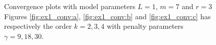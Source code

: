 \begin{figure}
    \caption{ Convergence plots with model parameters $L=1$, $m=7$ and $r=3$ Figures \ref{fig:ex1_conv:a}, \ref{fig:ex1_conv:b} and \ref{fig:ex1_conv:c} has respectively the order $k=2,3, 4$ with penalty parameters $\gamma = 9,18,30 $.  }
    \label{fig:ex1_conv}
\end{figure}


